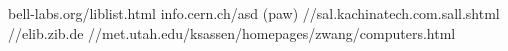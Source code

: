 bell-labs.org/liblist.html
info.cern.ch/asd (paw)
//sal.kachinatech.com.sall.shtml
//elib.zib.de
//met.utah.edu/ksassen/homepages/zwang/computers.html
